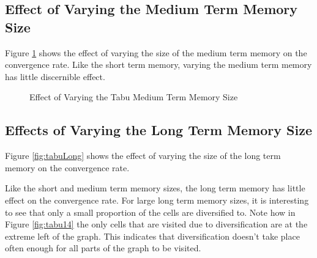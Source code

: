 \documentclass[a4paper,12pt]{article}
\begin{document}
\subsection{Effect of Varying the Medium Term Memory Size}

Figure \ref{fig:tabuMedium} shows the effect of varying the size of the medium term memory on the convergence rate.
Like the short term memory, varying the medium term memory has little discernible effect.

\begin{figure}[H]
\centering
{}
\caption{Effect of Varying the Tabu Medium Term Memory Size}
\label{fig:tabuMedium}
\end{figure}

\subsection{Effects of Varying the Long Term Memory Size}

Figure \ref{fig:tabuLong} shows the effect of varying the size of the long term memory on the convergence rate.

Like the short and medium term memory sizes, the long term memory has little effect on the convergence rate. 
For large long term memory sizes, it is interesting to see that only a small proportion of the cells are diversified to.
Note how in Figure \ref{fig:tabu14} the only cells that are visited due to diversification are at the extreme left of the graph. 
This indicates that diversification doesn't take place often enough for all parts of the graph to be visited. 
\end{document}
